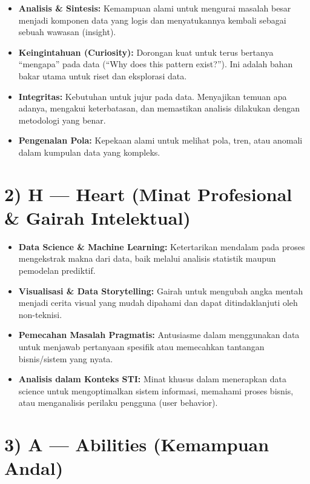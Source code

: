 \documentclass[
  letterpaper,
  DIV=11,
  numbers=noendperiod]{scrreprt}
\providecommand{\tightlist}{%
  \setlength{\itemsep}{0pt}\setlength{\parskip}{0pt}}
\begin{document}
\begin{itemize}
\tightlist
\item
  \textbf{Analisis \& Sintesis:} Kemampuan alami untuk mengurai masalah
  besar menjadi komponen data yang logis dan menyatukannya kembali
  sebagai sebuah wawasan (insight).
\item
  \textbf{Keingintahuan (Curiosity):} Dorongan kuat untuk terus bertanya
  ``mengapa'' pada data (``Why does this pattern exist?''). Ini adalah
  bahan bakar utama untuk riset dan eksplorasi data.
\item
  \textbf{Integritas:} Kebutuhan untuk jujur pada data. Menyajikan
  temuan apa adanya, mengakui keterbatasan, dan memastikan analisis
  dilakukan dengan metodologi yang benar.
\item
  \textbf{Pengenalan Pola:} Kepekaan alami untuk melihat pola, tren,
  atau anomali dalam kumpulan data yang kompleks.
\end{itemize}

\section{2) H --- Heart (Minat Profesional \& Gairah
Intelektual)}\label{h-heart-minat-profesional-gairah-intelektual}

\begin{itemize}
\tightlist
\item
  \textbf{Data Science \& Machine Learning:} Ketertarikan mendalam pada
  proses mengekstrak makna dari data, baik melalui analisis statistik
  maupun pemodelan prediktif.
\item
  \textbf{Visualisasi \& Data Storytelling:} Gairah untuk mengubah angka
  mentah menjadi cerita visual yang mudah dipahami dan dapat
  ditindaklanjuti oleh non-teknisi.
\item
  \textbf{Pemecahan Masalah Pragmatis:} Antusiasme dalam menggunakan
  data untuk menjawab pertanyaan spesifik atau memecahkan tantangan
  bisnis/sistem yang nyata.
\item
  \textbf{Analisis dalam Konteks STI:} Minat khusus dalam menerapkan
  data science untuk mengoptimalkan sistem informasi, memahami proses
  bisnis, atau menganalisis perilaku pengguna (user behavior).
\end{itemize}

\section{3) A --- Abilities (Kemampuan
Andal)}\label{a-abilities-kemampuan-andal}
\end{document}
